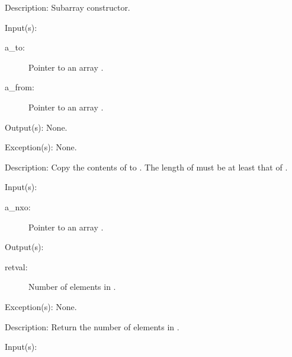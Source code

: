 \begin{capi}
\begin{capilist}
	\item[Description: ]
		Subarray constructor.
	\end{capilist}
\label{nxo_array_copy}
	\begin{capilist}
	\item[Input(s): ]
		\begin{description}\item[]
		\item[a\_to: ]
			Pointer to an array .
		\item[a\_from: ]
			Pointer to an array .
		\end{description}
	\item[Output(s): ] None.
	\item[Exception(s): ] None.
	\item[Description: ]
		Copy the contents of  to .  The length
		of  must be at least that of .
	\end{capilist}
\label{nxo_array_len_get}
	\begin{capilist}
	\item[Input(s): ]
		\begin{description}\item[]
		\item[a\_nxo: ]
			Pointer to an array \classname{nxo}.
		\end{description}
	\item[Output(s): ]
		\begin{description}\item[]
		\item[retval: ]
			Number of elements in \cvar{a\_nxo}.
		\end{description}
	\item[Exception(s): ] None.
	\item[Description: ]
		Return the number of elements in \cvar{a\_nxo}.
	\end{capilist}
\label{nxo_array_el_get}
	\begin{capilist}
	\item[Input(s): ]
		\begin{description}\item[]

\end{description}
\end{capilist}
\end{capi}
